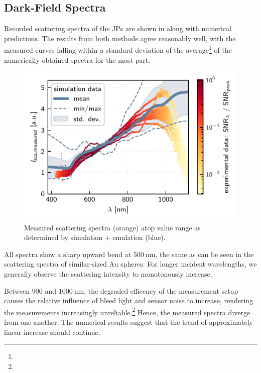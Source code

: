 \documentclass[10pt]{article}
\newcommand{\reffig}[2]{\mbox{\sffamily{Figure \ref{#1}#2}}}
\begin{document}
\subsection*{Dark-Field Spectra}




Recorded scattering spectra of the JPs are shown in \reffig{fig:spectra-measured}, along with numerical predictions. 
The results from both methods agree reasonably well, with the measured curves falling within a standard deviation of the average\footnote{} of the numerically obtained spectra for the most part. 

\begin{figure}[h]
    \centering
    \includegraphics{[fig] spectra (measured).PDF}
    \caption{Measured scattering spectra (orange) atop value range as determined by simulation + emulation (blue).}
    \label{fig:spectra-measured}
\end{figure}


All spectra show a sharp upward bend at $\SI{500}{\nano\meter}$, the same as can be seen in the scattering spectra of similar-sized Au spheres. 
For longer incident wavelengths, we generally observe the scattering intensity to monotonously increase. 

Between $900$ and $\SI{1000}{\nano\meter}$, the degraded efficency of the measurement setup causes the relative influence of bleed light and sensor noise to increase, rendering the measurements increasingly unreliable.\footnote{} 
Hence, the measured spectra diverge from one another. 
The numerical results suggest that the trend of approximately linear increase should continue. 
\end{document}
